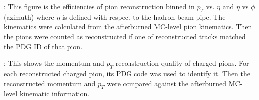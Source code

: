 \documentclass{bench}
\begin{document}
:
This figure is the efficiencies of pion reconstruction binned in $p_T$ vs. $\eta$ and $\eta$ vs $\phi$ (azimuth) where $\eta$ is defined with respect to the hadron beam pipe. The kinematics were calculated from the afterburned MC-level pion kinematics. Then the pions were counted as reconstructed if one of reconstructed tracks matched the PDG ID of that pion.


:
This shows the momentum and $p_T$ reconstruction quality of charged pions. For each reconstructed charged pion, its PDG code was used to identify it. Then the reconstructed momentum and $p_T$ were compared against the afterburned MC-level kinematic information.
\end{document}
